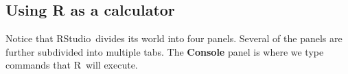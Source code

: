 \documentclass[twoside]{book}\usepackage[]{graphicx}\usepackage[]{xcolor}
\renewcommand{\code}[1]{{\color{blue!80!black}\texttt{#1}}}
\def\R{{\sf R}}
\def\Rstudio{{\sf RStudio}}
\def\tab#1{{\sf #1}}
\begin{document}

\subsection{Using R as a calculator}

Notice that \Rstudio\ divides its world into four panels.  Several of the panels
are further subdivided into multiple tabs.
The \textbf{Console} panel is where we type commands that \R\ will execute. 
\end{document}
